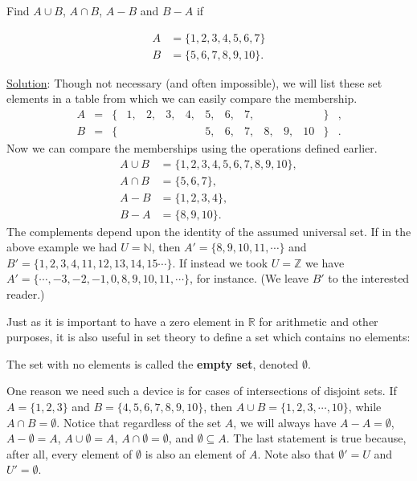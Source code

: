 \bex
Find $A\cup B$,  $A\cap B$, $A-B$ and $B-A$  if

\begin{align*}
A&=\{1,2,3,4,5,6,7\}\\
B&=\{5,6,7,8,9,10\}.
\end{align*}

\underline{Solution}: Though not necessary (and often impossible),
we will list these set elements in a table from which we can
easily compare the membership.
$$\begin{array}{rrrrrrrrrrrrrrl}
A&=&\{&1,&2,&3,&4,&5,&6,&7,&  &  &  &\}&,\\
B&=&\{&  &  &  &  &5,&6,&7,&8,&9,&10&\}&.\end{array}$$
Now we can compare the memberships using the operations defined earlier.
\begin{align*}
A\cup B&=\{1,2,3,4,5,6,7,8,9,10\},\\
A\cap B&=\{5,6,7\},\\
A-B&=\{1,2,3,4\},\\
B-A&=\{8,9,10\}.\end{align*}
\eex
The complements depend upon the identity of the assumed universal
set.  If in the above example we had $U=\mathbb{N}$, 
then $A'=\{8,9,10,11,\cdots\}$
and $B'=\{1,2,3,4,11,12,13,14,15\cdots\}$.  If instead we took
$U=\mathbb{Z}$ we have $A'=\{\cdots,-3,-2,-1,0,8,9,10,11,\cdots\}$,
for instance.  (We leave $B'$ to the interested reader.)

Just as it is important to have a zero element in $\mathbb{R}$
for arithmetic and other purposes, it is also useful in set
theory to define a set which contains no elements:
\begin{definition}
The set with no elements is called the {\bf empty set},\footnotemark
{} 
 denoted $\emptyset$.
\end{definition}
One reason we need such a device is for cases of intersections
of disjoint sets.  If $A=\{1,2,3\}$ and $B=\{4,5,6,7,8,9,10\}$,
then $A\cup B=\{1,2,3,\cdots,10\}$, while $A\cap B=\emptyset$.
Notice that regardless of the set $A$, we will always have
$A-A=\emptyset$, $A-\emptyset=A$,
 $A\cup\emptyset=A$, $A\cap\emptyset=\emptyset$,
and $\emptyset\subseteq A$.  The last statement is 
true because, after all, every element of $\emptyset$ is 
also an element of $A$.\footnotemark
Note also that $\emptyset'=U$ and $U'=\emptyset$.

